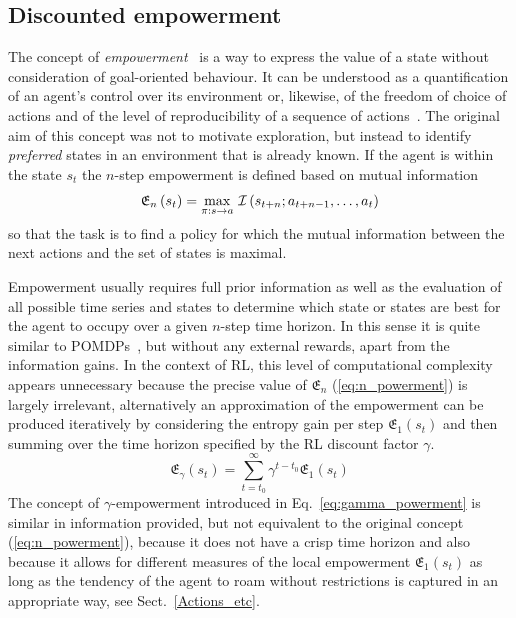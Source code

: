 \documentclass{article}
\begin{document}

\subsection{Discounted empowerment\label{emp}\label{gammares}}

The concept of \emph{empowerment}~\citep{klyubin2005empowerment} is a way to 
express the value of a state without consideration of goal-oriented behaviour.
It can be understood as a quantification of an agent's control over its environment
or, likewise, of the freedom of choice of actions and of the 
level of reproducibility of a sequence of actions~\citep{salge2014empowerment}.
The original aim  of this concept was not to motivate exploration, 
but instead to identify \emph{preferred} states in an environment that is already known.
If the agent is within the state $s_t$ the $n$-step empowerment is defined based on mutual 
information
\begin{equation}
\mathfrak{E}_{n}\left(s_{t}\right)=\max_{\pi:s\to a}\,{\cal I}\left(s_{t+n};a_{t+n-1},\dots,a_{t}\right)\label{eq:n_powerment}
\end{equation}
so that the task is to find a policy for which the mutual information between the next actions and the set of states is maximal.

Empowerment usually requires full prior information as well as the evaluation of all possible time series and states to determine which state or states are best for the agent to occupy over a given $n$-step time horizon. In this sense it is quite similar to POMDPs~\cite{kaelbling1998planning}, 
but without any external rewards, apart from the information gains.
In the context of RL, this level of computational complexity appears unnecessary because the precise value of $\mathfrak{E}_{n}$ (\ref{eq:n_powerment}) is largely irrelevant, alternatively an approximation of the empowerment can be produced iteratively by considering the entropy gain per step 
$\mathfrak{E}_{1}\left(s_{t}\right)$ and then summing over the time
horizon specified by the RL discount factor $\gamma$.
\begin{equation}
	\mathfrak{E}_{\gamma}\left(s_{t}\right)=\sum_{t=t_0}^\infty
	\gamma^{t-t_0}\mathfrak{E}_{1}\left(s_{t}\right)
	\label{eq:gamma_powerment}
\end{equation}
The concept of $\gamma$-empowerment introduced in 
Eq.~\ref{eq:gamma_powerment} is similar in information provided, but not equivalent to the original 
concept (\ref{eq:n_powerment}), because it does not have a 
crisp time horizon and also because it allows for different 
measures of the local empowerment 
$\mathfrak{E}_{1}\left(s_{t}\right)$ as long as 
the tendency of the agent to roam without restrictions is captured in
an appropriate way, see Sect.~\ref{Actions_etc}.
\end{document}
